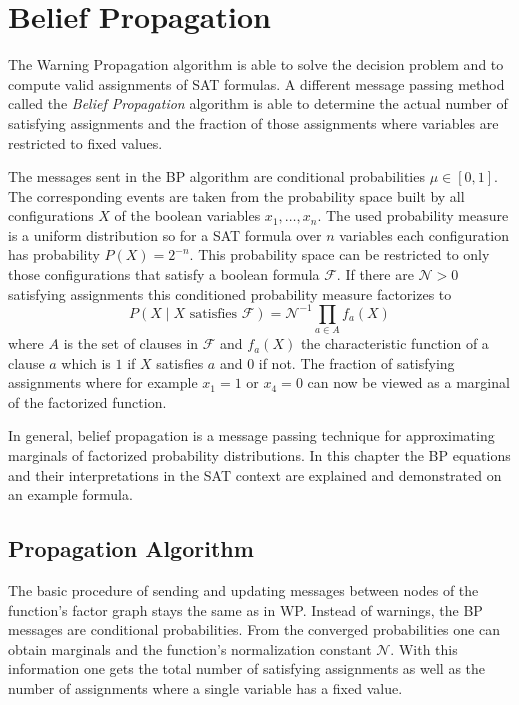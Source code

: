 \section{Belief Propagation} \label{BP}

The Warning Propagation algorithm is able to solve the decision problem and to compute valid assignments of SAT formulas. A different message passing method called the \emph{Belief Propagation} algorithm is able to determine the actual number of satisfying assignments and the fraction of those assignments where variables are restricted to fixed values. 

The messages sent in the BP algorithm are conditional probabilities $\mu \in [0, 1]$. The corresponding events are taken from the probability space built by all configurations $X$ of the  boolean variables $x_1, \ldots, x_n$. The used probability measure is a uniform distribution so for a SAT formula over $n$ variables each configuration has probability $P(X) = 2^{-n}$. \newline
This probability space can be restricted to only those configurations that satisfy a boolean formula $\mathcal{F}$. If there are $\mathcal{N} > 0$ satisfying assignments this conditioned probability measure factorizes to $$P(X \; | \; X \text{ satisfies } \mathcal{F}) = \mathcal{N}^{-1} \prod_{a \in A} f_a(X)$$
where $A$ is the set of clauses in $\mathcal{F}$ and $f_a(X)$ the characteristic function of a clause $a$ which is $1$ if $X$ satisfies $a$ and $0$ if not. \newline
The fraction of satisfying assignments where for example $x_1 = 1$ or $x_4 = 0$ can now be viewed as a marginal of the factorized function. \newline

In general, belief propagation is a message passing technique for approximating marginals of factorized probability distributions. In this chapter the BP equations and their interpretations in the SAT context are explained and demonstrated on an example formula.

\subsection{Propagation Algorithm} \label{BPA}

The basic procedure of sending and updating messages between nodes of the function's factor graph stays the same as in WP. Instead of warnings, the BP messages are conditional probabilities. From the converged probabilities one can obtain marginals and the function's normalization constant $\mathcal{N}$. With this information one gets the total number of satisfying assignments as well as the number of assignments where a single variable has a fixed value.

